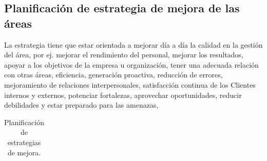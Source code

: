     \subsection{Planificación de estrategia de mejora de las áreas}
    La estrategia tiene que estar orientada a mejorar día a día la calidad en la gestión del área, por ej. mejorar el rendimiento del personal, mejorar los resultados, apoyar a los objetivos de la empresa u organización, tener una adecuada relación con otras áreas,  eficiencia, generación proactiva, reducción de errores, mejoramiento de relaciones interpersonales, satisfacción continua de los Clientes internos y externos, potenciar fortalezas, aprovechar oportunidades, reducir debilidades y estar preparado para las amenazas, 

\begin{center}
\begin{longtable}{|>{\centering\arraybackslash}m{3cm}|>{\centering\arraybackslash}m{3cm}|m{7cm}|}
\caption{Planificación de estrategias de mejora.}
\\


\end{longtable}
\end{center}

